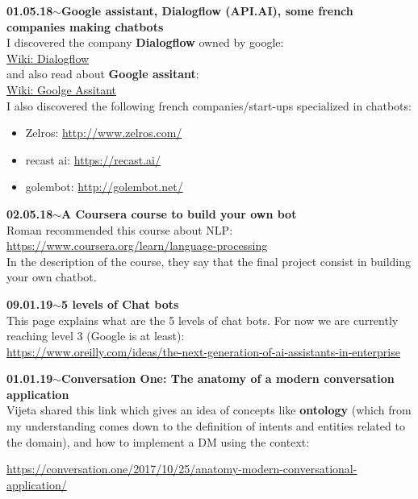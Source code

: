 \documentclass[11pt,a4paper]{article}
\newenvironment{loggentry}[2]%
{\noindent\textbf{#1}\hspace{1cm}$\mathbf{\sim}$\text{ }\textbf{#2}\\}{\vspace{0.5cm}}
\begin{document}
\begin{loggentry}{01.05.18}{Google assistant, Dialogflow (API.AI), some french companies making chatbots}
I discovered the company \textbf{Dialogflow} owned by google:\\
\href{https://en.wikipedia.org/wiki/Dialogflow}{Wiki: Dialogflow}\\
and also read about \textbf{Google assitant}:\\
\href{https://en.wikipedia.org/wiki/Google_Assistant}{Wiki: Goolge Assitant}\\
I also discovered the following french companies/start-ups specialized in chatbots:\\
\begin{itemize}
\item Zelros: \url{http://www.zelros.com/}
\item recast ai: \url{https://recast.ai/}
\item golembot: \url{http://golembot.net/}
\end{itemize}
\end{loggentry}

\begin{loggentry}{02.05.18}{A Coursera course to build your own bot}
Roman recommended this course about NLP:\\
\url{https://www.coursera.org/learn/language-processing}\\
In the description of the course, they say that the final project consist in building your own chatbot.
\end{loggentry}

\begin{loggentry}{09.01.19}{5 levels of Chat bots}

This page explains what are the 5 levels of chat bots. For now we are currently reaching level 3 (Google is at least):\\
\url{https://www.oreilly.com/ideas/the-next-generation-of-ai-assistants-in-enterprise}\\

\end{loggentry}

\begin{loggentry}{01.01.19}{Conversation One: The anatomy of a modern conversation application}

Vijeta shared this link which gives an idea of concepts like \textbf{ontology} (which from my understanding comes down to the definition of intents and entities related to the domain), and how to implement a DM using the context:

\url{https://conversation.one/2017/10/25/anatomy-modern-conversational-application/}

\end{loggentry}
\end{document}
